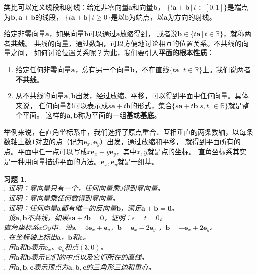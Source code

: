 \documentclass[12pt,UTF8]{ctexbook}
\newtheorem{xt}{习题}[section]
\begin{document}
类比可以定义线段和射线：给定非零向量$\mathbf{a}$和向量$\mathbf{b}$，
$ \{t\mathbf{a}+\mathbf{b} \, | \, t\in [0, 1]\}$是端点为$\mathbf{b}, \mathbf{a} + \mathbf{b}$的线段，
$ \{t\mathbf{a}+\mathbf{b} \, | \, t \geqslant 0 \}$是以$\mathbf{b}$为端点，以$\mathbf{a}$为方向的射线。

给定非零向量$\mathbf{a}$，如果向量$\mathbf{b}$可以通过$\mathbf{a}$放缩得到，
或者说$\mathbf{b}\in \{t\mathbf{a} \, | \, t\in\mathbb{R}\}$，就称两者\textbf{共线}。
共线的向量，通过数轴，可以方便地讨论相互的位置关系。不共线的向量之间，
如何讨论位置关系呢？为此，我们要引入\textbf{平面的根本性质}：
\begin{enumerate}
    \item 给定任何非零向量$\mathbf{a}$，总有另一个向量$\mathbf{b}$，不在直线$ \{t\mathbf{a} \, | \, t\in\mathbb{R}\}$上。我们说两者\textbf{不共线}。
    \item 从不共线的向量$\mathbf{a}, \mathbf{b}$出发，经过放缩、平移，可以得到平面中任何向量。具体来说，
    任何向量都可以表示成$s\mathbf{a} + t\mathbf{b}$的形式，集合$\{s\mathbf{a} + t\mathbf{b} | s, t, \in\mathbb{R}\}$就是整个平面。
    这样的$\mathbf{a}, \mathbf{b}$称为平面的一组\textbf{基}或\textbf{基底}。
\end{enumerate}

举例来说，在直角坐标系中，我们选择了原点重合、互相垂直的两条数轴，以每条数轴上数$1$对应的点（记为$\mathbf{e}_x, \mathbf{e}_y$）出发，通过放缩和平移，
就得到平面所有的点。平面中任一点可以写成$x\mathbf{e}_x + y\mathbf{e}_y$，其中$x,y$就是点的坐标。
直角坐标系其实是一种用向量描述平面的方法。$\mathbf{e}_x, \mathbf{e}_y$就是一组基。

\begin{xt}\label{xt:0-0-10}
    \mbox{} \\
    . 证明：零向量只有一个，任何向量乘$0$得到零向量。\\
    . 证明：零向量乘任何数得到零向量。\\
    . 证明：任何向量$\mathbf{a}$都有唯一的反向量$\mathbf{b}$，满足$\mathbf{a} + \mathbf{b} = \mathbf{0}$。\\
    . 设$\mathbf{a}, \mathbf{b}$不共线，如果$s\mathbf{a} + t\mathbf{b} = \mathbf{0}$，证明：$s = t = 0$。\\
    直角坐标系$xOy$中，设$\mathbf{a} = 4\mathbf{e}_x + \mathbf{e}_y$，$\mathbf{b} = \mathbf{e}_x - 2\mathbf{e}_y$
    ，$\mathbf{b} = -\mathbf{e}_x + 2\mathbf{e}_y$。\\
    . 在坐标轴上标出$\mathbf{a}$，$\mathbf{b}$和$\mathbf{c}$。\\
    . 用$\mathbf{a}$和$\mathbf{b}$表示$\mathbf{e}_x$、$\mathbf{e}_y$和点$(3,0)$。\\
    . 用$\mathbf{a}$和$\mathbf{b}$表示它们的中点以及它们所在的直线。\\
    . 用$\mathbf{a}, \mathbf{b}, \mathbf{c}$表示顶点为$\mathbf{a}, \mathbf{b}, \mathbf{c}$的三角形三边和重心。
\end{xt}
\end{document}
